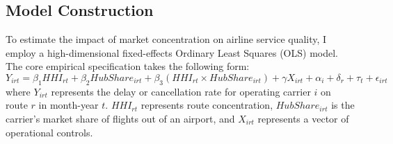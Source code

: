 \documentclass[preprint,12pt,authoryear]{elsarticle}
\begin{document}
\begin{table}[htbp]
\centering
\caption{Key Variables Summary Statistics of the Full Sample ($N = 667,836$)}
\label{tab:summary_stats}
\small %
\end{table}

\FloatBarrier

\subsection{Model Construction}
\label{sec:model_construction}
To estimate the impact of market concentration on airline service quality, I employ a high-dimensional fixed-effects Ordinary Least Squares (OLS) model. The core empirical specification takes the following form:
\begin{equation}
    Y_{irt} = \beta_1 HHI_{rt} + \beta_2 HubShare_{irt} + \beta_3 (HHI_{rt} \times HubShare_{irt}) + \gamma X_{irt} + \alpha_i + \delta_r + \tau_t + \epsilon_{irt}
\end{equation}
where $Y_{irt}$ represents the delay or cancellation rate for operating carrier $i$ on route $r$ in month-year $t$. $HHI_{rt}$ represents route concentration, $HubShare_{irt}$ is the carrier's market share of flights out of an airport, and $X_{irt}$ represents a vector of operational controls.
\end{document}
